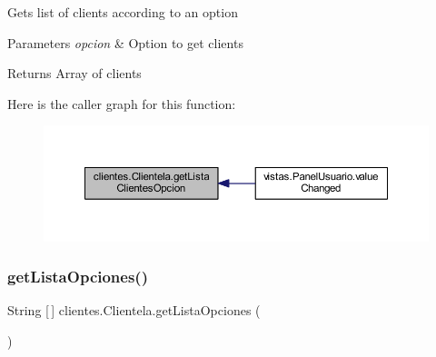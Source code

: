 Gets list of clients according to an option 
\begin{DoxyParams}{Parameters}
{\em opcion} & Option to get clients \\
\hline
\end{DoxyParams}
\begin{DoxyReturn}{Returns}
Array of clients 
\end{DoxyReturn}
Here is the caller graph for this function\+:\nopagebreak
\begin{figure}[H]
\begin{center}
\leavevmode
\includegraphics[width=350pt]{classclientes_1_1_clientela_a8275e9ef86c96a9070cff779e5a0169e_icgraph}
\end{center}
\end{figure}
\mbox{\label{classclientes_1_1_clientela_a036492cd5e2bba079ef0874b9693d9e1}} 
\subsubsection{\texorpdfstring{get\+Lista\+Opciones()}{getListaOpciones()}}
{\footnotesize\ttfamily String \mbox{[}$\,$\mbox{]} clientes.\+Clientela.\+get\+Lista\+Opciones (\begin{DoxyParamCaption}{ }\end{DoxyParamCaption})}

